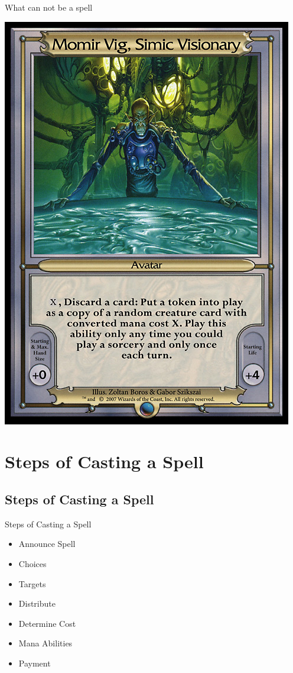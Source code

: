 \documentclass[utf8x]{beamer}
\begin{document}
\begin{frame}{What can not be a spell}
\begin{itemize}
{{        \includegraphics[scale=.21]{Momir}}}
      \end{itemize}
    \end{frame}

\section{Steps of Casting a Spell}
  \subsection*{Steps of Casting a Spell}
  
    \begin{frame}{Steps of Casting a Spell}
      \begin{itemize}
        \item Announce Spell
        \item Choices
        \item Targets
        \item Distribute
        \item Determine Cost
        \item Mana Abilities
        \item Payment
      \end{itemize}
    \end{frame}
\end{document}

